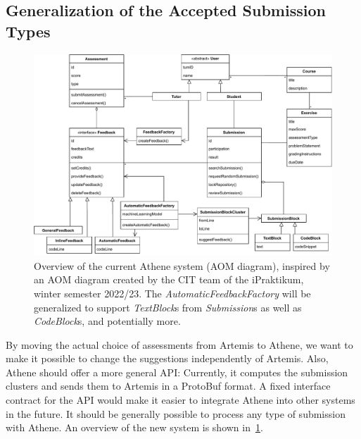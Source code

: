 \subsection*{Generalization of the Accepted Submission Types}
\begin{figure}[ht]
    \centering
    \includegraphics[width=\linewidth]{figures/proposal/aom.pdf}
    \caption{Overview of the current Athene system (AOM diagram), inspired by an AOM diagram created by the CIT team of the iPraktikum, winter semester 2022/23. The \textit{AutomaticFeedbackFactory} will be generalized to support \textit{TextBlock}s from \textit{Submission}s as well as \textit{CodeBlock}s, and potentially more.}
    \label{fig:aom}
\end{figure}
\noindent By moving the actual choice of assessments from Artemis to Athene, we want to make it possible to change the suggestions independently of Artemis. Also, Athene should offer a more general API: Currently, it computes the submission clusters and sends them to Artemis in a ProtoBuf format. A fixed interface contract for the API would make it easier to integrate Athene into other systems in the future. It should be generally possible to process any type of submission with Athene. An overview of the new system is shown in~\cref{fig:aom}.

